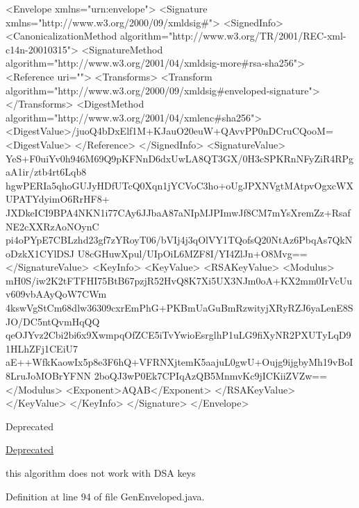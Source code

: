 \begin{DoxyPre}
 {\ttfamily 
<Envelope xmlns="urn:envelope">
 <Signature xmlns="http://www.w3.org/2000/09/xmldsig#">
   <SignedInfo>
     <CanonicalizationMethod algorithm="http://www.w3.org/TR/2001/REC-xml-c14n-20010315">
     <SignatureMethod algorithm="http://www.w3.org/2001/04/xmldsig-more#rsa-sha256">
     <Reference uri="">
       <Transforms>
         <Transform algorithm="http://www.w3.org/2000/09/xmldsig#enveloped-signature">
       </Transforms>
       <DigestMethod algorithm="http://www.w3.org/2001/04/xmlenc#sha256">
       <DigestValue>/juoQ4bDxElf1M+KJauO20euW+QAvvPP0nDCruCQooM=<DigestValue>
     </Reference>
   </SignedInfo>
   <SignatureValue>
     YeS+F0uiYv0h946M69Q9pKFNnD6dxUwLA8QT3GX/0H3cSPKRnNFyZiR4RPgaA1ir/ztb4rt6Lqb8
     hgwPERIa5qhoGUJyHDfUTcQ0Xqn1jYCVoC3ho+oUgJPXNVgtMAtpvOgxcWXUPATYdyimO6RrHF8+
     JXDkeICI9BPA4NKN1i77CAy6JJbaA87aNIpMJPImwJf8CM7mYsXremZz+RsafNE2cXXRzAoNOynC
     pi4oPYpE7CBLzhd23gf7zYRoyT06/bVIj4j3qOlVY1TQofsQ20NtAz6PbqAs7QkNoDzkX1CYlDSJ
     U8cGHuwXpul/UIpOiL6MZF8I/YI4ZlJn+O8Mvg==
   </SignatureValue>
   <KeyInfo>
     <KeyValue>
       <RSAKeyValue>
         <Modulus>
           mH0S/iw2K2tFTFHI75BtB67pzjR52HvQ8K7Xi5UX3NJm0oA+KX2mm0IrVcUuv609vbAAyQoW7CWm
           4kswVgStCm68dlw36309cxrEmPhG+PKBmUaGuBmRzwityjXRyRZJ6yaLenE8SJO/DC5ntQvmHqQQ
           qeOJYvz2Cbi2bi6x9XwmpqOfZCE5iTvYwioEsrglhP1uLG9fiXyNR2PXUTyLqD91HLhZFj1CEiU7
           aE++WfkKaowIx5p8e3F6hQ+VFRNXjtemK5aajuL0gwU+Oujg9ijgbyMh19vBoI8LruJoMOBrYFNN
           2boQJ3wP0Ek7CPIqAzQB5MnmvKc9jICKiiZVZw==
         </Modulus>
         <Exponent>AQAB</Exponent>
       </RSAKeyValue>
     </KeyValue>
   </KeyInfo>
 </Signature>
</Envelope>
 }
 \end{DoxyPre}


\begin{DoxyRefDesc}{Deprecated}
\item[\hyperlink{deprecated__deprecated000016}{Deprecated}]
\begin{DoxyItemize}
\item this algorithm does not work with D\-S\-A keys 
\end{DoxyItemize}\end{DoxyRefDesc}


Definition at line 94 of file Gen\-Enveloped.\-java.



